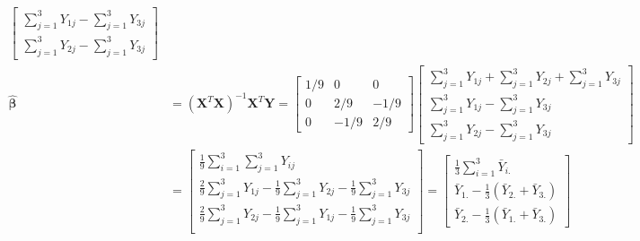\documentclass{article}
\begin{document}
\begin{enumerate}[leftmargin = 0 em, label = \arabic*., font = \bfseries]
\begin{enumerate}
\begin{align*}
\begin{bmatrix}
			\sum_{j = 1}^3 Y_{1j} - \sum_{j = 1}^3 Y_{3j}\\
			\sum_{j = 1}^3 Y_{2j} - \sum_{j = 1}^3 Y_{3j}
		\end{bmatrix}
		\\
		\hat{\bm \beta} &= (\bm X^T \bm X)^{-1}\bm X^T \bm Y = 
		\begin{bmatrix}
			1/9 & 0 & 0\\
			0 & 2/9 & -1/9\\
			0 & -1/9 & 2/9
		\end{bmatrix}
		\begin{bmatrix}
			\sum_{j = 1}^3 Y_{1j} + \sum_{j = 1}^3 Y_{2j} + \sum_{j = 1}^3 Y_{3j}\\
			\sum_{j = 1}^3 Y_{1j} - \sum_{j = 1}^3 Y_{3j}\\
			\sum_{j = 1}^3 Y_{2j} - \sum_{j = 1}^3 Y_{3j}
		\end{bmatrix}
		\\
		& = \begin{bmatrix}
			\frac{1}{9} \sum_{i = 1}^3 \sum_{j = 1}^3 Y_{ij}\\
			\frac{2}{9} \sum_{j = 1}^3 Y_{1j} - \frac{1}{9} \sum_{j = 1}^3 Y_{2j} - \frac{1}{9} \sum_{j = 1}^3 Y_{3j}\\
			\frac{2}{9} \sum_{j = 1}^3 Y_{2j} - \frac{1}{9} \sum_{j = 1}^3 Y_{1j} - \frac{1}{9} \sum_{j = 1}^3 Y_{3j}\\
		\end{bmatrix}
		=
		\begin{bmatrix}
			\frac{1}{3} \sum_{i = 1}^3 \bar{Y}_{i.}\\
			\bar{Y}_{1.} - \frac{1}{3} (\bar{Y}_{2.} + \bar{Y}_{3.})\\
			\bar{Y}_{2.} - \frac{1}{3} (\bar{Y}_{1.} + \bar{Y}_{3.})
		\end{bmatrix}
		\end{align*}



\end{enumerate}
\end{enumerate}
\end{document}
